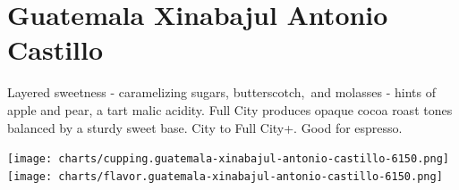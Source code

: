 \documentclass[10pt,twoside,footinclude=true,headinclude=true]{scrbook} %
\begin{document}

\chapter*{Guatemala Xinabajul Antonio Castillo}
 
\begin{addmargin}[2.2em]{2.2em}
\small
\justify
Layered sweetness - caramelizing sugars, butterscotch, and molasses - hints of apple and pear, a tart malic acidity. Full City produces opaque cocoa roast tones balanced by a sturdy sweet base. City to Full City+. Good for espresso.
\end{addmargin}

\centering
\vspace{2em}
\texttt{[image: charts/cupping.guatemala-xinabajul-antonio-castillo-6150.png]}
\texttt{[image: charts/flavor.guatemala-xinabajul-antonio-castillo-6150.png]}
\end{document}
